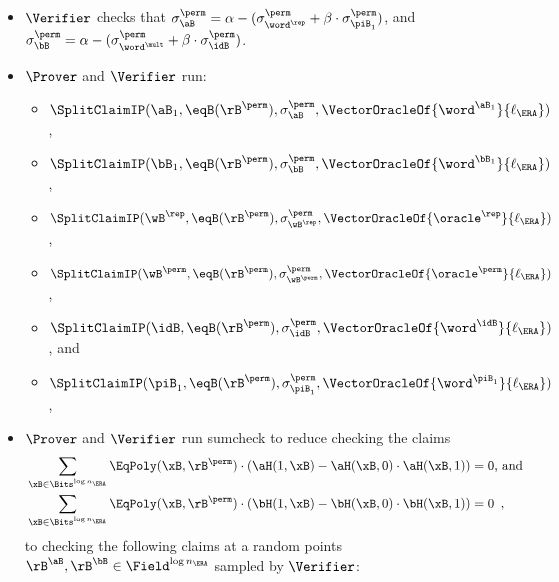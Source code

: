 \begin{tcolorbox}[breakable, enhanced, colback=white, boxrule=0.65pt]
\begin{enumerate}[nolistsep]
\begin{itemize}[nolistsep]
\begin{align*}
            \sigma^{\perm}_{\word^{\rep}} &\define \wH^{\rep}(\rB^{\perm}), \sigma^{\perm}_{\word^{\perm}} \define \wH^{\perm}(\rB^{\perm}), \text{ and } \sigma^{\perm}_{\piB_1} \define \piH_1(\rB^{\perm}) \enspace .
        \end{align*}
        \item $\Verifier$ checks that $\sigma^{\perm}_{\aB} = \alpha - ( \sigma^{\perm}_{\word^{\rep}} + \beta \cdot \sigma^{\perm}_{\piB_1} )$, and $\sigma^{\perm}_{\bB} = \alpha - ( \sigma^{\perm}_{\word^{\mult}} + \beta \cdot \sigma^{\perm}_{\idB} )$.
        \item $\Prover$ and $\Verifier$ run:
        \begin{itemize}[nolistsep]
            \item $\SplitClaimIP(\aB_{1}, \eqB(\rB^{\perm}), \sigma^{\perm}_{\aB}, \VectorOracleOf{\word^{\aB_{1}}}{\ell_{\ERA}})$,
            \item $\SplitClaimIP(\bB_{1}, \eqB(\rB^{\perm}), \sigma^{\perm}_{\bB}, \VectorOracleOf{\word^{\bB_{1}}}{\ell_{\ERA}})$,
            \item $\SplitClaimIP(\wB^{\rep}, \eqB(\rB^{\perm}), \sigma^{\perm}_{\wB^{\rep}}, \VectorOracleOf{\oracle^{\rep}}{\ell_{\ERA}})$,
            \item $\SplitClaimIP(\wB^{\perm}, \eqB(\rB^{\perm}), \sigma^{\perm}_{\wB^{\perm}}, \VectorOracleOf{\oracle^{\perm}}{\ell_{\ERA}})$,
            \item $\SplitClaimIP(\idB, \eqB(\rB^{\perm}), \sigma^{\perm}_{\idB}, \VectorOracleOf{\word^{\idB}}{\ell_{\ERA}})$, and
            \item $\SplitClaimIP(\piB_1, \eqB(\rB^{\perm}), \sigma^{\perm}_{\piB_1}, \VectorOracleOf{\word^{\piB_1}}{\ell_{\ERA}})$,
        \end{itemize}
        \item $\Prover$ and $\Verifier$ run sumcheck to reduce checking the claims 
        \begin{align*}
            &\sum_{\xB \in \Bits^{\log n_{\ERA}}} \EqPoly(\xB, \rB^{\perm}) \cdot ( \aH(1,\xB) - \aH(\xB,0) \cdot \aH(\xB,1) ) = 0 \text{, and } \\
            &\sum_{\xB \in \Bits^{\log n_{\ERA}}} \EqPoly(\xB, \rB^{\perm}) \cdot ( \bH(1,\xB) - \bH(\xB,0) \cdot \bH(\xB,1) ) = 0 \enspace,
        \end{align*}
        to checking the following claims at a random points $\rB^{\aB}, \rB^{\bB} \in \Field^{\log n_{\ERA}}$ sampled by $\Verifier$:
        \begin{align*}

\end{align*}
\end{itemize}
\end{enumerate}
\end{tcolorbox}
